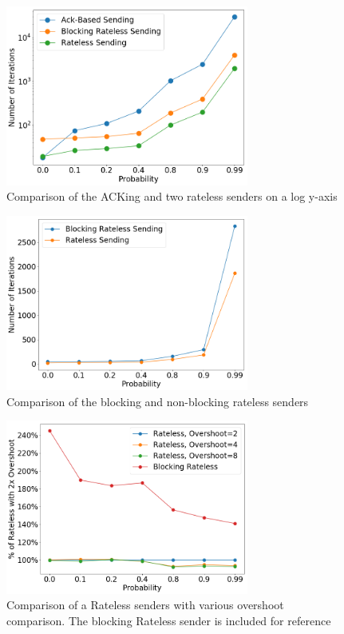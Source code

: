 \begin{figure}[tp]
\centering
\noindent
\includegraphics[width=8cm]{figures/TRIPLE_FINAL.png}
\caption{Comparison of the ACKing and two rateless senders on a log y-axis}
\label{graph:ackvsratelessLOG}
\end{figure}

\begin{figure}[tp]
\centering
\noindent
\includegraphics[width=8cm]{figures/big_font/BLOCKING_RATELESS_BETTER.png}
\caption{Comparison of the blocking and non-blocking rateless senders}
\label{graph:blockingvsnot}
\end{figure}

\begin{figure}[tp]
\centering
\noindent
\includegraphics[width=8cm]{figures/big_font/FACTOR_VARY_BETTER.png}
\caption{Comparison of a Rateless senders with various overshoot comparison. The blocking Rateless sender is included for reference}
\label{graph:varyParams}
\end{figure}


